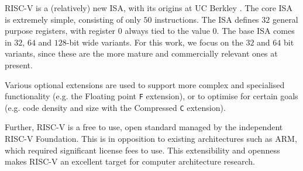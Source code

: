 
RISC-V is a (relatively) new ISA, with its origins at UC Berkley
\cite{riscv:1}.
The core ISA is extremely simple, consisting of only $50$ instructions.
The ISA defines $32$ general purpose registers, with register $0$ always
tied to the value $0$.
The base ISA comes in $32$, $64$ and $128$-bit wide variants.
For this work, we focus on the $32$ and $64$ bit variants, since these
are the more mature and commercially relevant ones at present.

Various optional extensions are used to support more complex and specialised
functionality (e.g. the Floating point {\tt F} extension),
or to optimise for certain goals (e.g. code density and size
with the Compressed {\tt C} extension).

Further, RISC-V is a free to use, open standard managed by the independent
RISC-V Foundation.
This is in opposition to existing architectures such as ARM, which required
significant license fees to use.
This extensibility and openness makes RISC-V an excellent target for
computer architecture research.


